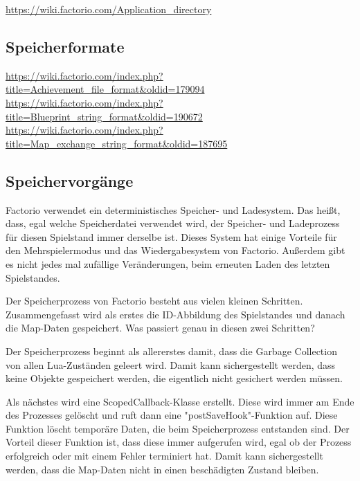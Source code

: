 \url{https://wiki.factorio.com/Application_directory} %



\subsection{Speicherformate}
\url{https://wiki.factorio.com/index.php?title=Achievement_file_format&oldid=179094}\\
\url{https://wiki.factorio.com/index.php?title=Blueprint_string_format&oldid=190672}\\
\url{https://wiki.factorio.com/index.php?title=Map_exchange_string_format&oldid=187695}\\



\subsection{Speichervorgänge}
Factorio verwendet ein deterministisches Speicher- und Ladesystem. Das heißt, dass, egal welche Speicherdatei verwendet wird, der Speicher- und Ladeprozess für diesen Spielstand immer derselbe ist. Dieses System hat einige Vorteile für den Mehrspielermodus und das Wiedergabesystem von Factorio. Außerdem gibt es nicht jedes mal zufällige Veränderungen, beim erneuten Laden des letzten Spielstandes.\cite{factorioGithubSaveLoad}

Der Speicherprozess von Factorio besteht aus vielen kleinen Schritten. Zusammengefasst wird als erstes die ID-Abbildung des Spielstandes und danach die Map-Daten gespeichert.
\cite{factorioFridayFacts270} Was passiert genau in diesen zwei Schritten? 

Der Speicherprozess beginnt als allererstes damit, dass die Garbage Collection von allen Lua-Zuständen geleert wird. Damit kann sichergestellt werden, dass keine Objekte gespeichert werden, die eigentlich nicht gesichert werden müssen.\cite{factorioGithubSaveLoad}

Als nächstes wird eine ScopedCallback-Klasse erstellt. Diese wird immer am Ende des Prozesses gelöscht und ruft dann eine "postSaveHook"-Funktion auf. Diese Funktion löscht temporäre Daten, die beim Speicherprozess entstanden sind. Der Vorteil dieser Funktion ist, dass diese immer aufgerufen wird, egal ob der Prozess erfolgreich oder mit einem Fehler terminiert hat. Damit kann sichergestellt werden, dass die Map-Daten nicht in einen beschädigten Zustand bleiben.\cite{factorioGithubSaveLoad}

